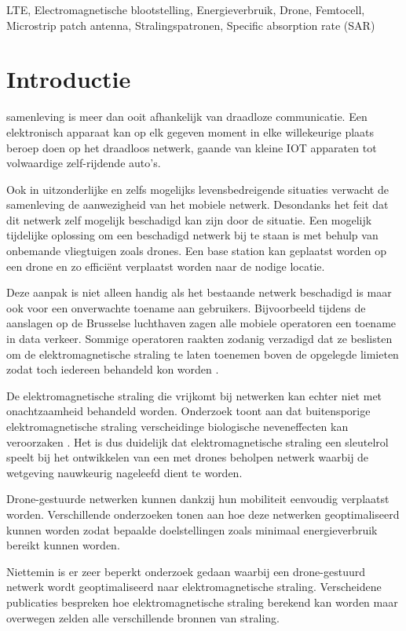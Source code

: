 \documentclass[twocolumn]{phdsymp_dutch}
\begin{document}
\begin{keywords}
LTE, Electromagnetische blootstelling, 
Energieverbruik, Drone,
Femtocell, Microstrip patch antenna, Stralingspatronen, Specific absorption rate (SAR)
\end{keywords}

\section{Introductie}
 samenleving is meer dan ooit afhankelijk van draadloze communicatie.
Een elektronisch apparaat kan op elk gegeven moment in elke willekeurige plaats beroep doen 
op het draadloos netwerk, gaande van kleine \gls{IOT} apparaten tot volwaardige zelf-rijdende auto's.

Ook in uitzonderlijke en zelfs mogelijks levensbedreigende situaties verwacht de samenleving de aanwezigheid 
van het mobiele netwerk. Desondanks het feit dat dit netwerk zelf mogelijk beschadigd kan zijn door de situatie.
Een mogelijk tijdelijke oplossing om een beschadigd netwerk bij te staan is met behulp van onbemande vliegtuigen zoals drones.
Een base station kan geplaatst worden op een drone en zo effici\"ent verplaatst worden naar de nodige locatie.

Deze aanpak is niet alleen handig als het bestaande netwerk beschadigd is maar ook voor een onverwachte toename aan gebruikers.
Bijvoorbeeld tijdens de aanslagen op de Brusselse luchthaven zagen alle mobiele operatoren een toename in data verkeer.
Sommige operatoren raakten zodanig verzadigd dat ze beslisten om de
elektromagnetische straling te laten toenemen boven de opgelegde limieten zodat toch iedereen behandeld kon worden \cite{baseZaventem}.

De elektromagnetische straling die vrijkomt bij netwerken kan echter niet met onachtzaamheid behandeld worden.
Onderzoek toont aan dat buitensporige elektromagnetische straling verscheidinge biologische neveneffecten kan veroorzaken \cite{J31_bioeffects,WHO}.
Het is dus duidelijk dat elektromagnetische straling een sleutelrol speelt bij het ontwikkelen van een met drones beholpen netwerk 
waarbij de wetgeving nauwkeurig nageleefd dient te worden.

Drone-gestuurde netwerken kunnen dankzij hun mobiliteit eenvoudig verplaatst worden. Verschillende onderzoeken 
tonen aan hoe deze netwerken geoptimaliseerd kunnen worden zodat bepaalde doelstellingen zoals minimaal energieverbruik
bereikt kunnen worden.

Niettemin is er zeer beperkt onderzoek gedaan waarbij een drone-gestuurd netwerk wordt geoptimaliseerd naar elektromagnetische straling.
Verscheidene publicaties bespreken hoe elektromagnetische straling berekend kan worden maar 
overwegen zelden alle verschillende bronnen van straling.
\end{document}
